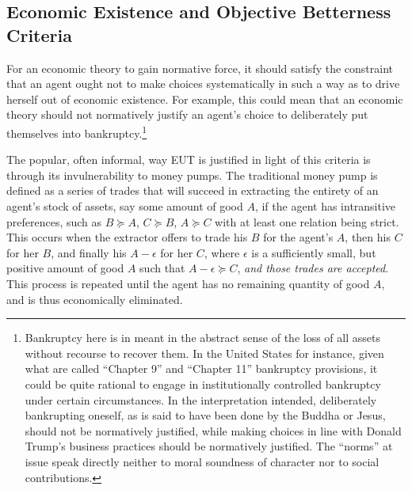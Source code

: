 \documentclass[../main.tex]{subfiles}
\begin{document}

\singlespacing
\subsection{Economic Existence and Objective Betterness Criteria}
\doublespacing

For an economic theory to gain normative force, it should satisfy the constraint that an agent ought not to make choices systematically in such a way as to drive herself out of economic existence.
For example, this could mean that an economic theory should not normatively justify an agent's choice to deliberately put themselves into bankruptcy.\footnote{
	Bankruptcy here is in meant in the abstract sense of the loss of all assets without recourse to recover them.
	In the United States for instance, given what are called \enquote{Chapter 9} and \enquote{Chapter 11} bankruptcy provisions, it could be quite rational to engage in institutionally controlled bankruptcy under certain circumstances.
	In the interpretation intended, deliberately bankrupting oneself, as is said to have been done by the Buddha or Jesus, should not be normatively justified, while making choices in line with Donald Trump's business practices should be normatively justified.
	The \enquote{norms} at issue speak directly neither to moral soundness of character nor to social contributions.
} 

The popular, often informal, way EUT is justified in light of this criteria is through its invulnerability to money pumps.
The traditional money pump is defined as a series of trades that will succeed in extracting the entirety of an agent's stock of assets, say some amount of good $A$, if the agent has intransitive preferences, such as $B \succcurlyeq A$, $C \succcurlyeq B$, $A \succcurlyeq C$ with at least one relation being strict.
This occurs when the extractor offers to trade his $B$ for the agent's $A$, then his $C$ for her $B$, and finally his $A - \epsilon$ for her $C$, where $\epsilon$ is a sufficiently small, but positive amount of good $A$ such that $A - \epsilon \succcurlyeq C$, \textit{and those trades are accepted}.
This process is repeated until the agent has no remaining quantity of good $A$, and is thus economically eliminated.
\end{document}
